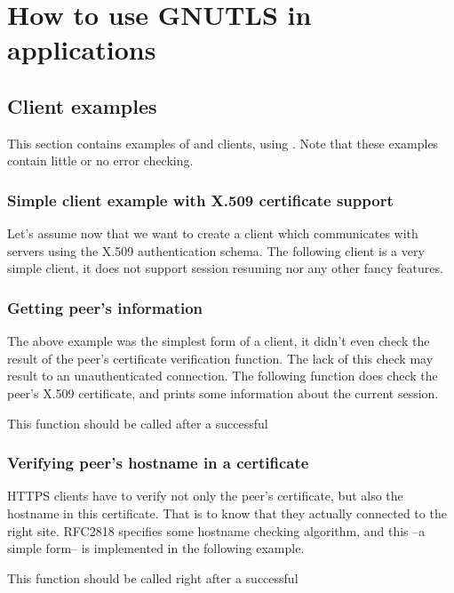 \chapter{How to use GNUTLS in applications}
\label{examples}

\section{Client examples}
This section contains examples of \tls{} and \ssl{} clients, using \gnutls{}. 
Note that these examples contain little or no error checking.

\subsection{Simple client example with X.509 certificate support}
Let's assume now that we want to create a client which communicates
with servers using the X.509 authentication schema. The following client
is a very simple \tls{} client, it does not support session resuming nor
any other fancy features.


\subsection{Getting peer's information}
\par The above example was the simplest form of a client, it didn't even check
the result of the peer's certificate verification function. The lack of
this check may result to an unauthenticated connection.
The following function does check the peer's
X.509 certificate, and prints some information about the current session.
\par
This function should be called after a successful



\subsection{Verifying peer's hostname in a certificate}
\par HTTPS clients have to verify not only the peer's certificate,
but also the hostname in this certificate. That is to know that
they actually connected to the right site.
RFC2818 specifies some hostname checking algorithm, and this --a simple form--
is implemented in the following example.

\par
This function should be called right after a successful

